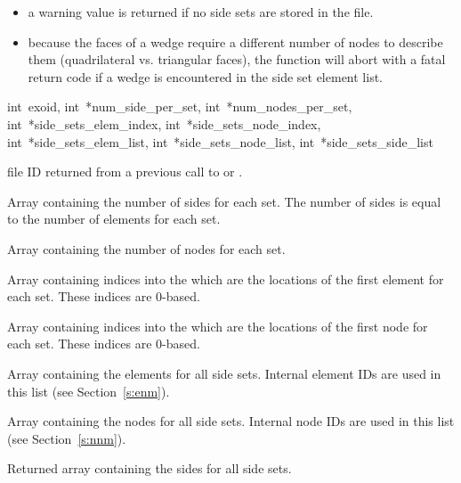 \begin{itemize}
 \item a warning value is returned if no side sets are stored in the
 file.

 \item because the faces of a wedge require a different number of
 nodes to describe them (quadrilateral vs. triangular faces), the
 function will abort with a fatal return code if a wedge is
 encountered in the side set element list.
\end{itemize}

{int~exoid,
int~*num_side_per_set,
int~*num_nodes_per_set,
int~*side_sets_elem_index,
int~*side_sets_node_index,
int~*side_sets_elem_list,
int~*side_sets_node_list,
int~*side_sets_side_list}

\begin{parameters}
\item[{int exoid \R{}}]
\exo{} file ID returned from a previous call to 
or .

\item[{int* num_side_per_set \R{}}]
Array containing the number of sides for each set. The number
of sides is equal to the number of elements for each set.

\item[{int* num_nodes_per_set \R{}}]
Array containing the number of nodes for each set.

\item[{int* side_sets_elem_index \R{}}]
Array containing indices into the  which are
the locations of the first element for each set. These indices are
0-based.

\item[{int* side_sets_node_index \R{}}]
Array containing indices into the 
which are the locations of the first node for each set. These
indices are 0-based.

\item[{int* side_sets_elem_list \R{}}]
Array containing the elements for all side sets. Internal element IDs
are used in this list (see Section~\ref{s:enm}).

\item[{int* side_sets_node_list \R{}}]
Array containing the nodes for all side sets. Internal node
IDs are used in this list (see  Section~\ref{s:nnm}).

\item[{int* side_sets_side_list \W{}}]
Returned array containing the sides for all side sets.
\end{parameters}

